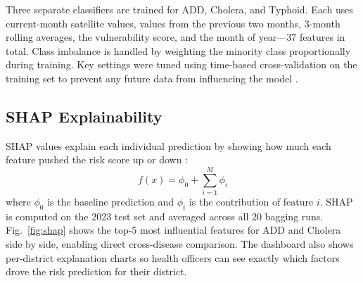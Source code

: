 \documentclass[conference]{IEEEtran}
\begin{document}
Three separate classifiers are trained for ADD, Cholera, and Typhoid.
Each uses current-month satellite values, values from the previous two
months, 3-month rolling averages, the vulnerability score, and the
month of year---37 features in total. Class imbalance is handled by
weighting the minority class proportionally during training. Key
settings were tuned using time-based cross-validation on the training
set to prevent any future data from influencing the model
\cite{elhassani2025}.

\subsection{SHAP Explainability}

SHAP values explain each individual prediction by showing how much each
feature pushed the risk score up or down \cite{lundberg2017}:
\begin{equation}
f(x) = \phi_0 + \sum_{i=1}^{M}\phi_i
\end{equation}
where $\phi_0$ is the baseline prediction and $\phi_i$ is the
contribution of feature $i$. SHAP is computed on the 2023 test set and
averaged across all 20 bagging runs. Fig.~\ref{fig:shap} shows the
top-5 most influential features for ADD and Cholera side by side,
enabling direct cross-disease comparison. The dashboard also shows
per-district explanation charts so health officers can see exactly
which factors drove the risk prediction for their district.
\end{document}
